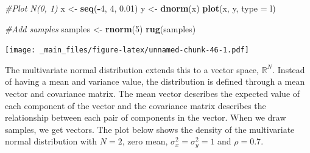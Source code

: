 \documentclass[
]{book}
\newenvironment{Shaded}{\begin{snugshade}}{\end{snugshade}}
\newcommand{\AttributeTok}[1]{\textcolor[rgb]{0.13,0.29,0.53}{#1}}
\newcommand{\CommentTok}[1]{\textcolor[rgb]{0.56,0.35,0.01}{\textit{#1}}}
\newcommand{\DecValTok}[1]{\textcolor[rgb]{0.00,0.00,0.81}{#1}}
\newcommand{\FloatTok}[1]{\textcolor[rgb]{0.00,0.00,0.81}{#1}}
\newcommand{\FunctionTok}[1]{\textcolor[rgb]{0.13,0.29,0.53}{\textbf{#1}}}
\newcommand{\NormalTok}[1]{#1}
\newcommand{\OtherTok}[1]{\textcolor[rgb]{0.56,0.35,0.01}{#1}}
\newcommand{\SpecialCharTok}[1]{\textcolor[rgb]{0.81,0.36,0.00}{\textbf{#1}}}
\newcommand{\StringTok}[1]{\textcolor[rgb]{0.31,0.60,0.02}{#1}}
\theoremstyle{definition}
\theoremstyle{definition}
\theoremstyle{definition}
\theoremstyle{definition}
\theoremstyle{remark}
\begin{document}
\begin{Shaded}
\begin{Highlighting}[]
\CommentTok{\#Plot N(0, 1)}
\NormalTok{x }\OtherTok{\textless{}{-}} \FunctionTok{seq}\NormalTok{(}\SpecialCharTok{{-}}\DecValTok{4}\NormalTok{, }\DecValTok{4}\NormalTok{, }\FloatTok{0.01}\NormalTok{)}
\NormalTok{y }\OtherTok{\textless{}{-}} \FunctionTok{dnorm}\NormalTok{(x)}
\FunctionTok{plot}\NormalTok{(x, y, }\AttributeTok{type =} \StringTok{\textquotesingle{}l\textquotesingle{}}\NormalTok{)}

\CommentTok{\#Add samples}
\NormalTok{samples }\OtherTok{\textless{}{-}} \FunctionTok{rnorm}\NormalTok{(}\DecValTok{5}\NormalTok{)}
\FunctionTok{rug}\NormalTok{(samples)}
\end{Highlighting}
\end{Shaded}

\texttt{[image: \_main\_files/figure-latex/unnamed-chunk-46-1.pdf]}

The multivariate normal distribution extends this to a vector space, \(\mathbb{R}^N\). Instead of having a mean and variance value, the distribution is defined through a mean vector and covariance matrix. The mean vector describes the expected value of each component of the vector and the covariance matrix describes the relationship between each pair of components in the vector. When we draw samples, we get vectors. The plot below shows the density of the multivariate normal distribution with \(N = 2\), zero mean, \(\sigma^2_x = \sigma^2_y = 1\) and \(\rho = 0.7\).
\end{document}
